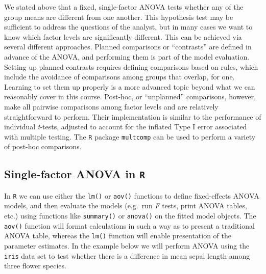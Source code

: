 \documentclass[]{book}
\newenvironment{Shaded}{\begin{snugshade}}{\end{snugshade}}
\newcommand{\DataTypeTok}[1]{\textcolor[rgb]{0.13,0.29,0.53}{#1}}
\newcommand{\DecValTok}[1]{\textcolor[rgb]{0.00,0.00,0.81}{#1}}
\newcommand{\FloatTok}[1]{\textcolor[rgb]{0.00,0.00,0.81}{#1}}
\newcommand{\KeywordTok}[1]{\textcolor[rgb]{0.13,0.29,0.53}{\textbf{#1}}}
\newcommand{\NormalTok}[1]{#1}
\newcommand{\OperatorTok}[1]{\textcolor[rgb]{0.81,0.36,0.00}{\textbf{#1}}}
\newcommand{\StringTok}[1]{\textcolor[rgb]{0.31,0.60,0.02}{#1}}
\begin{document}
We stated above that a fixed, single-factor ANOVA tests whether any of the group means are different from one another. This hypothesis test may be sufficient to address the questions of the analyst, but in many cases we want to know which factor levels are significantly different. This can be achieved via several different approaches. Planned comparisons or ``contrasts'' are defined in advance of the ANOVA, and performing them is part of the model evaluation. Setting up planned contrasts requires defining comparisons based on rules, which include the avoidance of comparisons among groups that overlap, for one. Learning to set them up properly is a more advanced topic beyond what we can reasonably cover in this course. Post-hoc, or ``unplanned'' comparisons, however, make all pairwise comparisons among factor levels and are relatively straightforward to perform. Their implementation is similar to the performance of individual \emph{t}-tests, adjusted to account for the inflated Type I error associated with multiple testing. The \texttt{R} package \texttt{multcomp} can be used to perform a variety of post-hoc comparisons.

\hypertarget{single-factor-anova-in-r}{%
\subsection{\texorpdfstring{Single-factor ANOVA in \texttt{R}}{Single-factor ANOVA in R}}\label{single-factor-anova-in-r}}

In \texttt{R} we can use either the \texttt{lm()} or \texttt{aov()} functions to define fixed-effects ANOVA models, and then evaluate the models (e.g.~run \emph{F} tests, print ANOVA tables, etc.) using functions like \texttt{summary()} or \texttt{anova()} on the fitted model objects. The \texttt{aov()} function will format calculations in such a way as to present a traditional ANOVA table, whereas the \texttt{lm()} function will enable presentation of the parameter estimates. In the example below we will perform ANOVA using the \texttt{iris} data set to test whether there is a difference in mean sepal length among three flower species.

\begin{Shaded}
\end{Shaded}
\end{document}
